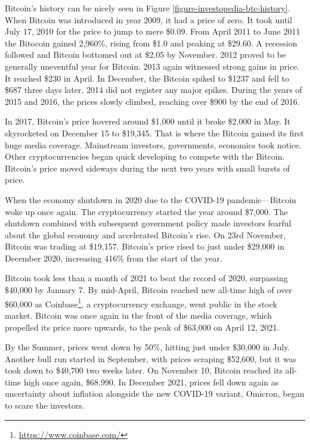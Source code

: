 Bitcoin's history can be nicely seen in Figure \ref{figure-investopedia-btc-history}. When Bitcoin was introduced in year 2009, it had a price of zero. It took until July 17, 2010 for the price to jump to mere \$0.09. From April 2011 to June 2011 the Bitocoin gained 2,960\%, rising from \$1.0 and peaking at \$29.60. A recession followed and Bitcoin bottomed out at \$2.05 by November. 2012 proved to be generally uneventful year for Bitcoin. 2013 again witnessed strong gains in price. It reached \$230 in April. In December, the Bitcoin spiked to \$1237 and fell to \$687 three days later. 2014 did not register any major spikes. During the years of 2015 and 2016, the prices slowly climbed, reaching over \$900 by the end of 2016.

In 2017, Bitcoin's price hovered around \$1,000 until it broke \$2,000 in May. It skyrocketed on December 15 to \$19,345. That is where the Bitcoin gained its first huge media coverage. Mainstream investors, governments, economics took notice. Other cryptocurrencies began quick developing to compete with the Bitcoin. Bitcoin's price moved sideways during the next two years with small bursts of price.

When the economy shutdown in 2020 due to the COVID-19 pandemic---Bitcoin woke up once again. The cryptocurrency started the year around \$7,000. The shutdown combined with subsequent government policy made investors fearful about the global economy and accelerated Bitcoin's rise. On 23rd November, Bitcoin was trading at \$19,157. Bitcoin's price rised to just under \$29,000 in December 2020, increasing 416\% from the start of the year.

Bitcoin took less than a month of 2021 to beat the record of 2020, surpassing \$40,000 by January 7. By mid-April, Bitcoin reached new all-time high of over \$60,000 as Coinbase\footnote{\url{https://www.coinbase.com/}}, a cryptocurrency exchange, went public in the stock market. Bitcoin was once again in the front of the media coverage, which propelled its price more upwards, to the peak of \$63,000 on April 12, 2021.

By the Summer, prices went down by 50\%, hitting just under \$30,000 in July. Another bull run started in September, with prices scraping \$52,600, but it was took down to \$40,700 two weeks later. On November 10, Bitcoin reached its all-time high once again, \$68,990. In December 2021, prices fell down again as uncertainty about inflation alongside the new COVID-19 variant, Omicron, began to scare the investors.

